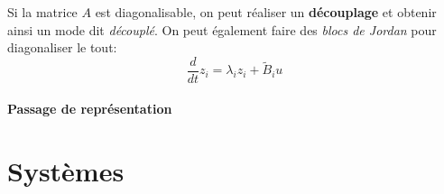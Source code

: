 \documentclass{report}
\begin{document}
Si la matrice $A$ est diagonalisable, on peut réaliser un \textbf{découplage} et obtenir ainsi un mode dit \textit{découplé}. On peut également faire des \textit{blocs de Jordan} pour diagonaliser le tout:
\begin{equation}
\frac{d}{dt} z_i = \lambda_i z_i + \tilde{B}_i u
\end{equation}

\subsection{Passage de représentation}


\part{Systèmes}
\end{document}
